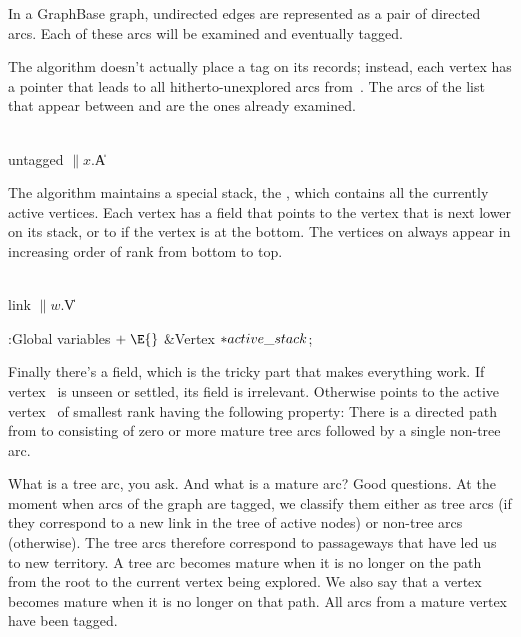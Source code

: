 In a GraphBase graph, undirected edges are represented as a pair of directed
arcs. Each of these arcs will be examined and eventually tagged.

The algorithm doesn't actually place a tag on its  records;
instead,
each vertex  has a pointer  that leads to all
hitherto-unexplored arcs from~. The arcs of the list that appear
between  and  are the ones
already examined.

\Y\B\4\D\\{untagged}\5
$\|x.{}$\|A\par
\fi

The algorithm maintains a special stack, the ,
which contains
all the currently active vertices. Each vertex has a  field that
points
to the vertex that is next lower on its stack, or to \PB{$\NULL$} if the vertex
is
at the bottom. The vertices on  always appear in
increasing
order of rank from bottom to top.

\Y\B\4\D\\{link}\5
$\|w.{}$\|V\par
\Y\B\4:Global variables\X${}\mathrel+\E{}$\6
\&{Vertex} ${}{*}\\{active\_stack}{}$;\par
\fi

Finally there's a  field, which is the tricky part that makes
everything work. If vertex~ is unseen or settled, its 
field is
irrelevant. Otherwise  points to the active vertex~
of smallest rank having the following property:
There is a directed path from  to  consisting of
zero or more mature tree arcs followed by a single non-tree arc.

What is a tree arc, you ask. And what is a mature arc? Good questions. At the
moment when arcs of the graph are tagged, we classify them either as tree
arcs (if they correspond to a new  link in the tree of active
nodes) or non-tree arcs (otherwise). The tree arcs therefore correspond to
passageways that have led us to new territory. A tree arc becomes mature
when it is no longer on the path from the root to the current vertex being
explored. We also say that a vertex becomes mature when it is
no longer on that path. All arcs from a mature vertex have been tagged.

